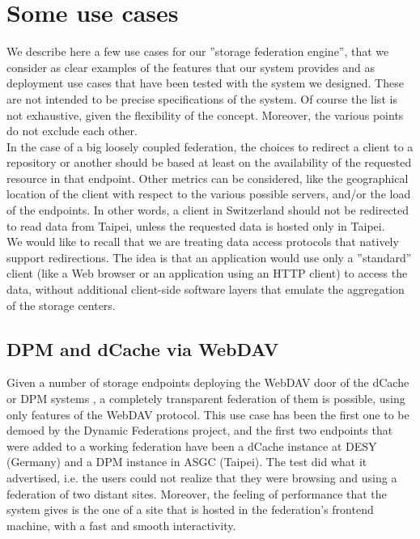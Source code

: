 \documentclass[12pt]{article} %
\begin{document}
\section{Some use cases}
We describe here a few use cases for our ''storage federation engine'', that we consider as clear examples of the features that our system provides and as deployment use cases that have been tested with the system we designed. These are not intended to be precise specifications of the system. Of course the list is not exhaustive, given the flexibility of the concept. Moreover, the various points do not exclude each other.\\

In the case of a big loosely coupled federation, the choices to redirect a client to a repository or another should be based at least on the availability of the requested resource in that endpoint. Other metrics can be considered, like the geographical location of the client with respect to the various possible servers, and/or the load of the endpoints.
In other words, a client in Switzerland should not be redirected to read data from Taipei, unless the requested data is hosted only in Taipei.\\

We would like to recall that we are treating data access protocols that natively support redirections. The idea is that an application would use only a ''standard'' client (like a Web browser or an application using an HTTP client) to access the data, without additional client-side software layers that emulate the aggregation of the storage centers.

\subsection{DPM and dCache via WebDAV}

Given a number of storage endpoints deploying the WebDAV door of the dCache or DPM systems \cite{dpmfuture} \cite{dpmnew}, a completely transparent federation of them is possible, using only features of the WebDAV protocol.
This use case has been the first one to be demoed by the Dynamic Federations project, and the first two endpoints that were added to a working federation have been a dCache instance at DESY (Germany) and a DPM instance in ASGC (Taipei). The test did what it advertised, i.e. the users could not realize that they were browsing and using a federation of two distant sites. Moreover, the feeling of performance that the system gives is the one of a site that is hosted in the federation's frontend machine, with a fast and smooth interactivity.
\end{document}
